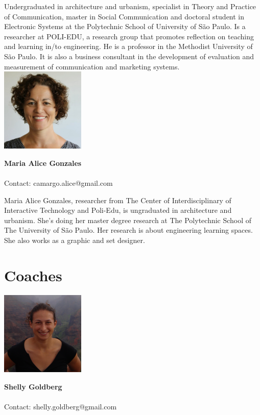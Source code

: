 Undergraduated in architecture and urbanism, specialist in Theory and Practice of Communication, master in Social Communication and doctoral student in Electronic Systems at the Polytechnic School of University of São Paulo. Is a researcher at POLI-EDU, a research group that promotes reflection on teaching and learning  in/to engineering. He is a professor in the Methodist University of São Paulo. It is also a business consultant in the development of evaluation and measurement of communication and marketing systems.
\\ 
\noindent \includegraphics[width=40mm]{images/maria_alice.jpg}
\parbox[b]{0.6\textwidth}{\textbf{Maria Alice Gonzales}\\ \\
Contact: camargo.alice@gmail.com
}

Maria Alice Gonzales, researcher from The Center of Interdisciplinary of Interactive Technology and Poli-Edu, is ungraduated in architecture and urbanism. She’s doing her master degree research at The Polytechnic School of The University of São Paulo. Her research is about engineering learning spaces. She also works as a graphic and set designer.
\\

\section{Coaches}

\noindent \includegraphics[width=40mm]{images/shelly.png}
\parbox[b]{0.6\textwidth}{\textbf{Shelly Goldberg}\\ \\
Contact: shelly.goldberg@gmail.com  \\
}

